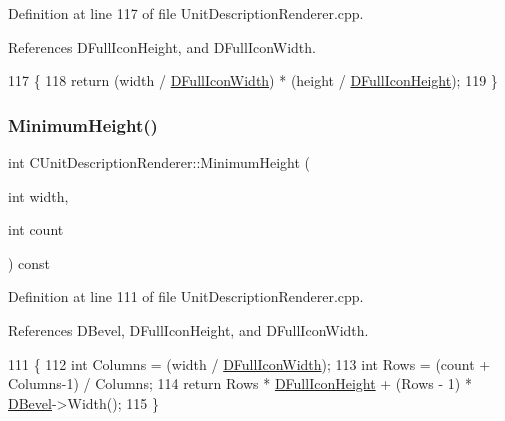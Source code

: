Definition at line 117 of file Unit\+Description\+Renderer.\+cpp.



References D\+Full\+Icon\+Height, and D\+Full\+Icon\+Width.


\begin{DoxyCode}
117                                                                      \{
118     \textcolor{keywordflow}{return} (width / \hyperlink{classCUnitDescriptionRenderer_a4bd79032fe13b9c09386a24cb8ef7650}{DFullIconWidth}) * (height / \hyperlink{classCUnitDescriptionRenderer_ae9f7d843d0eabd4b1f1b19bfa5332754}{DFullIconHeight});
119 \}
\end{DoxyCode}
\hypertarget{classCUnitDescriptionRenderer_a6899e564a8a96ba6539faee409ac93ad}{}\label{classCUnitDescriptionRenderer_a6899e564a8a96ba6539faee409ac93ad} 
\subsubsection{\texorpdfstring{Minimum\+Height()}{MinimumHeight()}}
{\footnotesize\ttfamily int C\+Unit\+Description\+Renderer\+::\+Minimum\+Height (\begin{DoxyParamCaption}\item[{int}]{width,  }\item[{int}]{count }\end{DoxyParamCaption}) const}



Definition at line 111 of file Unit\+Description\+Renderer.\+cpp.



References D\+Bevel, D\+Full\+Icon\+Height, and D\+Full\+Icon\+Width.


\begin{DoxyCode}
111                                                                      \{
112     \textcolor{keywordtype}{int} Columns = (width / \hyperlink{classCUnitDescriptionRenderer_a4bd79032fe13b9c09386a24cb8ef7650}{DFullIconWidth});
113     \textcolor{keywordtype}{int} Rows = (count + Columns-1) / Columns;
114     \textcolor{keywordflow}{return} Rows * \hyperlink{classCUnitDescriptionRenderer_ae9f7d843d0eabd4b1f1b19bfa5332754}{DFullIconHeight} + (Rows - 1) * \hyperlink{classCUnitDescriptionRenderer_a9f4cd9f9d8dbc5036c885980494db41e}{DBevel}->Width();
115 \}
\end{DoxyCode}
\hypertarget{classCUnitDescriptionRenderer_aed1a5ab08252a5d550d3c26dfa979962}{}\label{classCUnitDescriptionRenderer_aed1a5ab08252a5d550d3c26dfa979962} 
